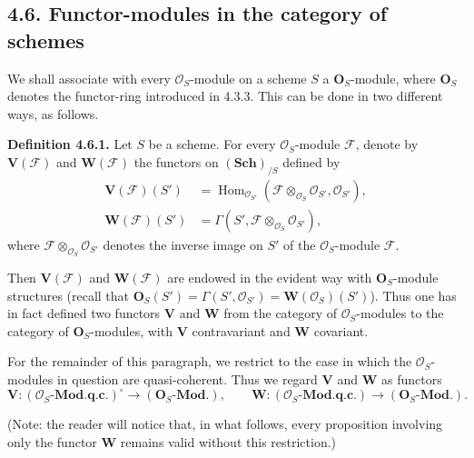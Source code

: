 \subsection*{4.6. Functor-modules in the category of schemes}

We shall associate with every \(\mathcal O_S\)-module on a scheme \(S\)
a \(\mathbf O_S\)-module, where \(\mathbf O_S\) denotes the functor-ring
introduced in 4.3.3. This can be done in two different ways, as follows.

\medskip
\noindent{}\textbf{Definition 4.6.1.}
Let \(S\) be a scheme. For every \(\mathcal O_S\)-module \(\mathscr F\),
denote by \(\mathbf V(\mathscr F)\) and \(\mathbf W(\mathscr F)\) the
functors on \((\mathbf{Sch})_{/S}\) defined by
\begin{align*}
  \mathbf V(\mathscr F)(S')
    &=\operatorname{Hom}_{\mathcal O_{S'}}
       (\mathscr F\otimes_{\mathcal O_S}\mathcal O_{S'},
        \mathcal O_{S'}),\\
  \mathbf W(\mathscr F)(S')
    &=\Gamma(S',\mathscr F\otimes_{\mathcal O_S}\mathcal O_{S'}),
\end{align*}
where \(\mathscr F\otimes_{\mathcal O_S}\mathcal O_{S'}\) denotes the
inverse image on \(S'\) of the \(\mathcal O_S\)-module \(\mathscr F\).

Then \(\mathbf V(\mathscr F)\) and \(\mathbf W(\mathscr F)\) are
endowed in the evident way with \(\mathbf O_S\)-module structures
(recall that
\(\mathbf O_S(S')=\Gamma(S',\mathcal O_{S'})
=\mathbf W(\mathcal O_S)(S')\)). Thus one has in fact defined two
functors \(\mathbf V\) and \(\mathbf W\) from the category of
\(\mathcal O_S\)-modules to the category of \(\mathbf O_S\)-modules,
with \(\mathbf V\) contravariant and \(\mathbf W\) covariant.

For the remainder of this paragraph, we restrict to the case in which
the \(\mathcal O_S\)-modules in question are quasi-coherent. Thus we
regard \(\mathbf V\) and \(\mathbf W\) as functors
\[
  \mathbf V:(\mathcal O_S\text{-}\mathbf{Mod.q.c.})^{\circ}
    \longrightarrow(\mathbf O_S\text{-}\mathbf{Mod.}),
  \qquad
  \mathbf W:(\mathcal O_S\text{-}\mathbf{Mod.q.c.})
    \longrightarrow(\mathbf O_S\text{-}\mathbf{Mod.}).
\]

(Note: the reader will notice that, in what follows, every proposition
involving only the functor \(\mathbf W\) remains valid without this
restriction.)

